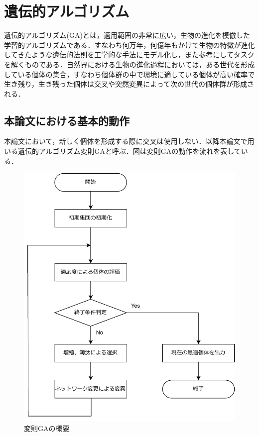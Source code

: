 \section{遺伝的アルゴリズム}
遺伝的アルゴリズム(GA)とは，適用範囲の非常に広い，生物の進化を模倣した学習的アルゴリズムである\cite{遺伝的アルゴリズム}．すなわち何万年，何億年もかけて生物の特徴が進化してきたような遺伝的法則を工学的な手法にモデル化し，また参考にしてタスクを解くものである．自然界における生物の進化過程においては，ある世代を形成している個体の集合，すなわち個体群の中で環境に適している個体が高い確率で生き残り，生き残った個体は交叉や突然変異によって次の世代の個体群が形成される．

\subsection{本論文における基本的動作}
本論文において，新しく個体を形成する際に交叉は使用しない．以降本論文で用いる遺伝的アルゴリズム変則GAと呼ぶ．図は変則GAの動作を流れを表している．

\begin{figure}[h]
    \begin{center}
        \includegraphics[scale=0.8]{img/expga.pdf}
        \caption{変則GAの概要}
    \end{center}
\end{figure}


